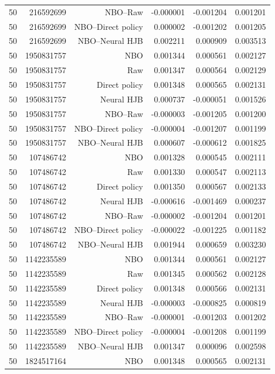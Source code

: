 \begin{longtable}{lrrrrr}
50 & 216592699 & NBO--Raw & -0.000001 & -0.001204 & 0.001201 \\
50 & 216592699 & NBO--Direct policy & 0.000002 & -0.001202 & 0.001205 \\
50 & 216592699 & NBO--Neural HJB & 0.002211 & 0.000909 & 0.003513 \\
50 & 1950831757 & NBO & 0.001344 & 0.000561 & 0.002127 \\
50 & 1950831757 & Raw & 0.001347 & 0.000564 & 0.002129 \\
50 & 1950831757 & Direct policy & 0.001348 & 0.000565 & 0.002131 \\
50 & 1950831757 & Neural HJB & 0.000737 & -0.000051 & 0.001526 \\
50 & 1950831757 & NBO--Raw & -0.000003 & -0.001205 & 0.001200 \\
50 & 1950831757 & NBO--Direct policy & -0.000004 & -0.001207 & 0.001199 \\
50 & 1950831757 & NBO--Neural HJB & 0.000607 & -0.000612 & 0.001825 \\
50 & 107486742 & NBO & 0.001328 & 0.000545 & 0.002111 \\
50 & 107486742 & Raw & 0.001330 & 0.000547 & 0.002113 \\
50 & 107486742 & Direct policy & 0.001350 & 0.000567 & 0.002133 \\
50 & 107486742 & Neural HJB & -0.000616 & -0.001469 & 0.000237 \\
50 & 107486742 & NBO--Raw & -0.000002 & -0.001204 & 0.001201 \\
50 & 107486742 & NBO--Direct policy & -0.000022 & -0.001225 & 0.001182 \\
50 & 107486742 & NBO--Neural HJB & 0.001944 & 0.000659 & 0.003230 \\
50 & 1142235589 & NBO & 0.001344 & 0.000561 & 0.002127 \\
50 & 1142235589 & Raw & 0.001345 & 0.000562 & 0.002128 \\
50 & 1142235589 & Direct policy & 0.001348 & 0.000566 & 0.002131 \\
50 & 1142235589 & Neural HJB & -0.000003 & -0.000825 & 0.000819 \\
50 & 1142235589 & NBO--Raw & -0.000001 & -0.001203 & 0.001202 \\
50 & 1142235589 & NBO--Direct policy & -0.000004 & -0.001208 & 0.001199 \\
50 & 1142235589 & NBO--Neural HJB & 0.001347 & 0.000096 & 0.002598 \\
50 & 1824517164 & NBO & 0.001348 & 0.000565 & 0.002131 \\

\end{longtable}
